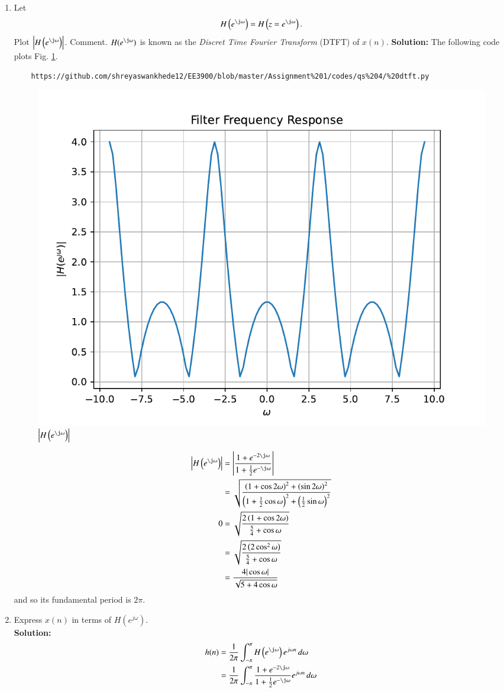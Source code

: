 \documentclass[journal,12pt,twocolumn]{IEEEtran}
\newcommand{\solution}{\noindent \textbf{Solution: }}
\providecommand{\brak}[1]{\ensuremath{\left(#1\right)}}
\providecommand{\abs}[1]{\left\vert#1\right\vert}
\numberwithin{equation}{section}
\renewcommand\thesection{\arabic{section}}
\renewcommand\thesection{\arabic{section}}
\begin{document}
\begin{enumerate}[label=\thesection.\arabic*]
%
\item 
Let
\begin{equation}
H\brak{e^{\j \omega}} = H\brak{z = e^{\j \omega}}.
\end{equation}
Plot $\abs{H\brak{e^{\j \omega}}}$.  Comment.  $H(e^{\j \omega})$ is
known as the {\em Discret Time Fourier Transform} (DTFT) of $x(n)$.
\solution The following code plots Fig. \ref{fig:dtft}.
\begin{lstlisting}
	https://github.com/shreyaswankhede12/EE3900/blob/master/Assignment%201/codes/qs%204/%20dtft.py
\end{lstlisting}
\begin{figure}[!ht]
\centering
\includegraphics[width=\columnwidth]{figs/4.5 dtft}
\caption{$\abs{H\brak{e^{\j\omega}}}$}
\label{fig:dtft}
\end{figure}
\begin{align}
	\left|H\brak{e^{\j\omega}}\right| &= \left|\frac{1 + e^{-2\j\omega}}{1 + \frac{1}{2}e^{-\j\omega}}\right| \\
									  &= \sqrt{\frac{\brak{1 + \cos{2\omega}}^2 + \brak{\sin{2\omega}}^2}{\brak{1 + \frac{1}{2}\cos{\omega}}^2 + \brak{\frac{1}{2}\sin{\omega}}^2}}\\
					0				  &= \sqrt{\frac{2\brak{1 + \cos{2\omega}}}{\frac{5}{4} + \cos{\omega}}} \\
									  &= \sqrt{\frac{2\brak{2\cos^2{\omega}}}{\frac{5}{4} + \cos{\omega}}} \\
									  &= \frac{4|\cos{\omega}|}{\sqrt{5 + 4\cos{\omega}}}
\end{align}
and so its fundamental period is $2\pi$.
\item Express $x(n)$ in terms of $H\brak{e^{j \omega}}$.\\
\solution
\begin{align}
     h(n) &= \frac{1}{2\pi} \int_{-\pi}^{\pi} H\brak{e^{\j \omega}}e^{j\omega n} \,d\omega \\
     &= \frac{1}{2\pi} \int_{-\pi}^{\pi} \frac{1 + e^{-2\j\omega}}{1 + \frac12 e^{-\j\omega}} e^{j\omega n} \,d\omega 
\end{align}
\end{enumerate}
\end{document}
